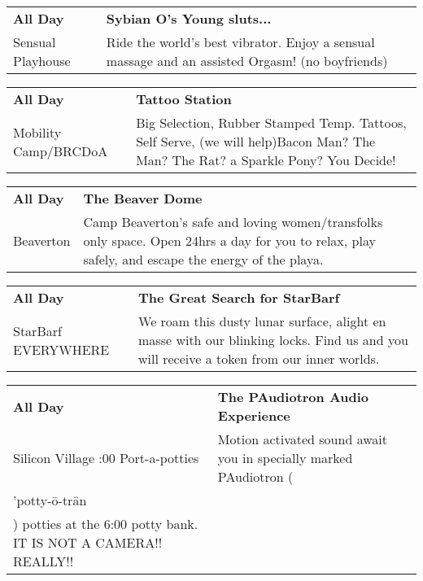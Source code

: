\begin{tabular}{ p{1in} p{2.2in} }
    \textbf{All Day} & \textbf{Sybian O's Young sluts...} \\
    Sensual Playhouse \newline  & Ride the world's best vibrator. Enjoy a sensual massage and an assisted Orgasm! (no boyfriends) \\
    \hline 
\end{tabular}
    
\begin{tabular}{ p{1in} p{2.2in} }
    \textbf{All Day} & \textbf{Tattoo Station} \\
    Mobility Camp/BRCDoA \newline  & Big Selection, Rubber Stamped Temp. Tattoos, Self Serve, (we will help)Bacon Man? The Man? The Rat? a Sparkle Pony? You Decide! \\
    \hline 
\end{tabular}
    
\begin{tabular}{ p{1in} p{2.2in} }
    \textbf{All Day} & \textbf{The Beaver Dome} \\
    Beaverton \newline  & Camp Beaverton's safe and loving women/transfolks only space. Open 24hrs a day for you to relax, play safely, and escape the energy of the playa. \\
    \hline 
\end{tabular}
    
\begin{tabular}{ p{1in} p{2.2in} }
    \textbf{All Day} & \textbf{The Great Search for StarBarf} \\
    StarBarf \newline EVERYWHERE & We roam this dusty lunar surface, alight en masse with our blinking locks. Find us and you will receive a token from our inner worlds. \\
    \hline 
\end{tabular}
    
\begin{tabular}{ p{1in} p{2.2in} }
    \textbf{All Day} & \textbf{The PAudiotron Audio Experience} \\
    Silicon Village \newline 6:00 Port-a-potties & Motion activated sound await you in specially marked PAudiotron (\\'potty-\=o-tr\"an\\) potties at the 6:00 potty bank.  IT IS NOT A CAMERA!!  REALLY!! \\
    \hline 
\end{tabular}
    
